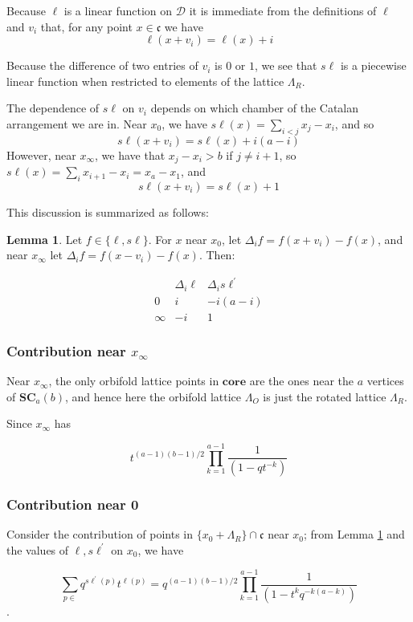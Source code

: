 \documentclass{amsart}[12pt]
\theoremstyle{definition}
\newtheorem{lemma}[dummy]{Lemma}
\newcommand{\core}{\mathbf{core}}
\newcommand{\SC}{\mathbf{SC}}
\newcommand{\sk}{s\ell}
\newcommand{\cone}{\mathfrak{c}}
\newcommand{\dominant}{\mathcal{D}}
\begin{document}
Because $\ell$ is a linear function on $\dominant$ it is immediate from the definitions of $\ell$ and $v_i$ that, for any point $x\in\cone$ we have  
$$\ell(x+v_i)=\ell(x)+i$$

Because the difference of two entries of $v_i$ is $0$ or $1$, we see that $\sk$ is a piecewise linear function when restricted to elements of the lattice $\Lambda_R$.

The dependence of $\sk$ on $v_i$ depends on which chamber of the Catalan arrangement we are in.  Near $x_0$, we have $\sk(x)=\sum_{i<j} x_j-x_i$, and so
$$\sk(x+v_i) = \sk(x)+i(a-i)$$
However, near $x_\infty$, we have that $x_j-x_i>b$ if $j\neq i+1$, so $\sk(x)=\sum_i x_{i+1}-x_i=x_a-x_1$, and
$$\sk(x+v_i)=\sk(x)+1$$

This discussion is summarized as follows:

\begin{lemma} \label{lem:table}
Let $f\in\{\ell,\sk\}$.  For $x$ near $x_0$, let $\Delta_if=f(x+v_i)-f(x)$, and near $x_\infty$ let $\Delta_if=f(x-v_i)-f(x)$.  Then:

$$\begin{array}{r|cc}
 & \Delta_i\ell & \Delta_i\sk^\prime \\
\hline
0 & i & -i(a-i) \\
\infty & -i & 1
\end{array}
$$
\end{lemma}

\subsubsection{Contribution near $x_\infty$}
Near $x_\infty$, the only orbifold lattice points in $\core$ are the ones near the $a$ vertices of $\SC_a(b)$, and hence here the orbifold lattice $\Lambda_O$ is just the rotated lattice $\Lambda_R$.  

Since $x_\infty$ has 

$$t^{(a-1)(b-1)/2}\prod_{k=1}^{a-1}\frac{1}{(1-qt^{-k})}$$


\subsubsection{Contribution near 0}
Consider the contribution of points in $\{x_0+\Lambda_R\}\cap\cone$ near $x_0$; from Lemma \ref{lem:table} and the values of $\ell, \sk^\prime$ on $x_0$, we have

$$\sum_{p\in } q^{\sk^\prime(p)}t^{\ell(p)}=q^{(a-1)(b-1)/2}\prod_{k=1}^{a-1} \frac{1}{(1-t^kq^{-k(a-k)})}$$.
\end{document}
